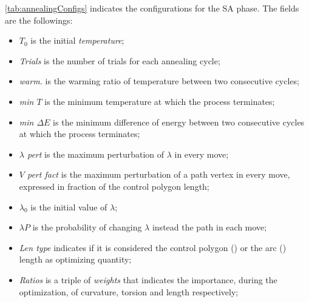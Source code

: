 \documentclass[dissertation.tex]{subfiles}
\begin{document}
\cref{tab:annealingConfigs} indicates the configurations for the
\ac{SA} phase. The fields are the followings:
\begin{itemize}
\item \emph{$T_0$} is the initial \emph{temperature};
\item \emph{Trials} is the number of trials for each annealing cycle;
\item \emph{warm.} is the warming ratio of temperature between two
  consecutive cycles;
\item \emph{min $T$} is the minimum temperature at which the process terminates;
\item \emph{min $\Delta E$} is the minimum difference of energy
  between two consecutive cycles at which the process terminates;
\item \emph{$\lambda$ pert} is the maximum perturbation of $\lambda$
  in every move;
\item \emph{$V$ pert fact}  is the maximum perturbation of a path vertex
  in every move, expressed in fraction of the control polygon length;
\item \emph{$\lambda_0$} is the initial value of $\lambda$;
\item \emph{$\lambda P$} is the probability of changing $\lambda$
  instead the path in each move;
\item \emph{Len type} indicates if it is considered the
  control polygon (\lenPol) or the arc (\lenArc) length as optimizing quantity;
\item \emph{Ratios} is a triple of \emph{weights} that indicates the
  importance, during the
  optimization, of curvature, torsion and length respectively;
\end{itemize}
\end{document}
